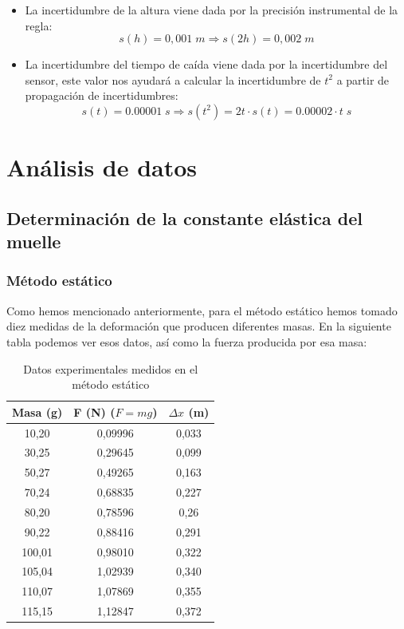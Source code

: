 \documentclass[a4paper,12pt,titlepage]{article}
\begin{document}
\begin{itemize}
    \item La incertidumbre de la altura viene dada por la precisión instrumental de la regla:
    \begin{equation}
        s(h) = 0,001\; m \Rightarrow s(2h) = 0,002 \; m
    \end{equation}
    \item La incertidumbre del tiempo de caída viene dada por la incertidumbre del sensor, este valor nos ayudará a calcular la incertidumbre de $t^2$ a partir de propagación de incertidumbres:
    \begin{equation}
        s(t) = 0.00001 \; s \Rightarrow s(t^2)= 2t \cdot s(t) = 0.00002 \cdot t \; s
        \label{Inc Tcuadrado}
    \end{equation}
\end{itemize}

\newpage

\section{Análisis de datos}

\subsection{Determinación de la constante elástica del muelle}

\subsubsection{Método estático}

Como hemos mencionado anteriormente, para el método estático hemos tomado diez medidas de la deformación que producen diferentes masas. En la siguiente tabla podemos ver esos datos, así como la fuerza producida por esa masa:

\begin{table}[h!]
    \centering
    \begin{tabular}{|c|c|c|}
    \hline
    Masa (g) & F (N) ($F=mg$) & $\Delta x$ (m) \\ \hline
    10,20   & 0,09996 & 0,033 \\ \hline
    30,25  & 0,29645 & 0,099 \\ \hline
    50,27  & 0,49265 & 0,163 \\ \hline
    70,24  & 0,68835 & 0,227 \\ \hline
    80,20   & 0,78596 & 0,26  \\ \hline
    90,22  & 0,88416 & 0,291 \\ \hline
    100,01 & 0,98010 & 0,322 \\ \hline
    105,04 & 1,02939 & 0,340  \\ \hline
    110,07 & 1,07869 & 0,355 \\ \hline
    115,15 & 1,12847 & 0,372 \\ \hline
    \end{tabular}
    \caption{Datos experimentales medidos en el método estático}
    \label{Datos estatico}
\end{table}
\end{document}
